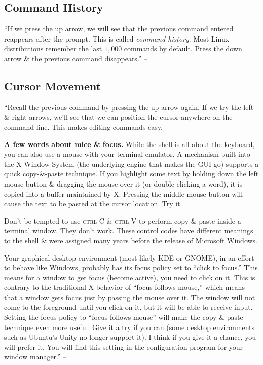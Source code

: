 \documentclass[oneside]{book}
\numberwithin{equation}{section}
\begin{document}
\subsection{Command History}
``If we press the up arrow, we will see that the previous command entered reappears after the prompt. This is called \textit{command history}. Most Linux distributions remember the last $1,000$ commands by default. Press the down arrow \& the previous command disappears.'' -- \cite[p. 39]{Shotts2019}

\subsection{Cursor Movement}
``Recall the previous command by pressing the up arrow again. If we try the left \& right arrows, we'll see that we can position the cursor anywhere on the command line. This makes editing commands easy.

\textbf{A few words about mice \& focus.} While the shell is all about the keyboard, you can also use a mouse with your terminal emulator. A mechanism built into the X Window System (the underlying engine that makes the GUI go) supports a quick copy-\&-paste technique. If you highlight some text by holding down the left mouse button \& dragging the mouse over it (or double-clicking a word), it is copied into a buffer maintained by X. Pressing the middle mouse button will cause the text to be pasted at the cursor location. Try it.

Don't be tempted to use \textsc{ctrl-C} \& \textsc{ctrl-V} to perform copy \& paste inside a terminal window. They don't work. These control codes have different meanings to the shell \& were assigned many years before the release of Microsoft Windows.

Your graphical desktop environment (most likely KDE or GNOME), in an effort to behave like Windows, probably has its focus policy set to ``click to focus.'' This means for a window to get focus (become active), you need to click on it. This is contrary to the traditional X behavior of ``focus follows mouse,'' which means that a window gets focus just by passing the mouse over it. The window will not come to the foreground until you click on it, but it will be able to receive input. Setting the focus policy to ``focus follows mouse'' will make the copy-\&-paste technique even more useful. Give it a try if you can (some desktop environments such as Ubuntu's Unity no longer support it). I think if you give it a chance, you will prefer it. You will find this setting in the configuration program for your window manager.'' -- \cite[p. 40]{Shotts2019}
\end{document}
